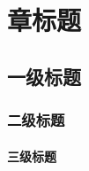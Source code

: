 \documentclass[titlestyle=center]
  {course-report}
\begin{document}
\mainmatter
\chapter{章标题}
\section{一级标题}
\subsection{二级标题}
\subsubsection{三级标题}
\clearpage\hbox{}
\end{document}
